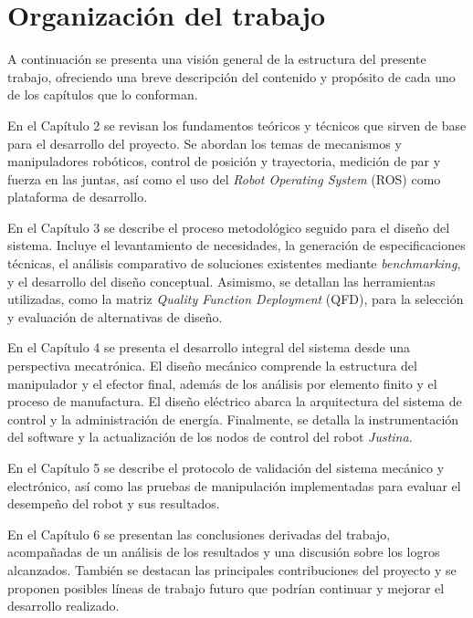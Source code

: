 \section{Organización del trabajo}

A continuación se presenta una visión general de la estructura del presente trabajo, ofreciendo una breve descripción del contenido y propósito de cada uno de los capítulos que lo conforman.

En el Capítulo 2 se revisan los fundamentos teóricos y técnicos que sirven de base para el desarrollo del proyecto. Se abordan los temas de mecanismos y manipuladores robóticos, control de posición y trayectoria, medición de par y fuerza en las juntas, así como el uso del \emph{Robot Operating System} (ROS) como plataforma de desarrollo.

En el Capítulo 3 se describe el proceso metodológico seguido para el diseño del sistema. Incluye el levantamiento de necesidades, la generación de especificaciones técnicas, el análisis comparativo de soluciones existentes mediante \emph{benchmarking}, y el desarrollo del diseño conceptual. Asimismo, se detallan las herramientas utilizadas, como la matriz \emph{Quality Function Deployment} (QFD), para la selección y evaluación de alternativas de diseño.

En el Capítulo 4 se presenta el desarrollo integral del sistema desde una perspectiva mecatrónica. El diseño mecánico comprende la estructura del manipulador y el efector final, además de los análisis por elemento finito y el proceso de manufactura. El diseño eléctrico abarca la arquitectura del sistema de control y la administración de energía. Finalmente, se detalla la instrumentación del software y la actualización de los nodos de control del robot \emph{Justina}.

En el Capítulo 5 se describe el protocolo de validación del sistema mecánico y electrónico, así como las pruebas de manipulación implementadas para evaluar el desempeño del robot y sus resultados.

En el Capítulo 6 se presentan las conclusiones derivadas del trabajo, acompañadas de un análisis de los resultados y una discusión sobre los logros alcanzados. También se destacan las principales contribuciones del proyecto y se proponen posibles líneas de trabajo futuro que podrían continuar y mejorar el desarrollo realizado.